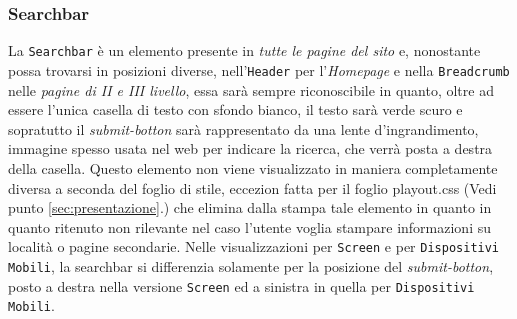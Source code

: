 \subsubsection{Searchbar}\label{sec:Pres-Searchbar}
La \texttt{Searchbar} è un elemento presente in \textit{tutte le pagine del sito} e, nonostante possa trovarsi in posizioni diverse, nell'\texttt{Header} per l'\textit{Homepage} e nella \texttt{Breadcrumb} nelle \textit{pagine di II e III livello}, essa sarà sempre riconoscibile in quanto, oltre ad essere l'unica casella di testo con sfondo bianco, il testo sarà verde scuro e sopratutto il \textit{submit-botton} sarà rappresentato da una lente d'ingrandimento, immagine spesso usata nel web per indicare la ricerca, che verrà posta a destra della casella.
Questo elemento non viene visualizzato in maniera completamente diversa a seconda del foglio di stile, eccezion fatta per il foglio playout.css (Vedi punto \ref{sec:presentazione}.) che elimina dalla stampa tale elemento in quanto in quanto ritenuto non rilevante nel caso l'utente voglia stampare informazioni su località o pagine secondarie.
Nelle visualizzazioni per \texttt{Screen} e per \texttt{Dispositivi Mobili}, la searchbar si differenzia solamente per la posizione del \textit{submit-botton}, posto a destra nella versione \texttt{Screen} ed a sinistra in quella per \texttt{Dispositivi Mobili}.